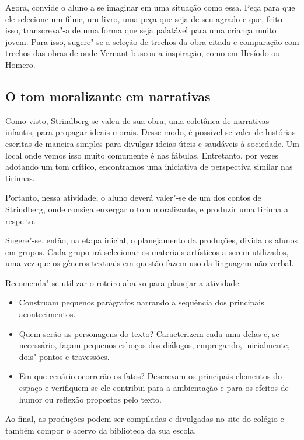 \documentclass[12pt]{extarticle}
\begin{document}
Agora, convide o aluno a se imaginar em uma situação como essa. Peça
para que ele selecione um filme, um livro, uma peça que seja de seu
agrado e que, feito isso, transcreva"-a de uma forma que seja palatável
para uma criança muito jovem. Para isso, sugere"-se a seleção de trechos
da obra citada e comparação com trechos das obras de onde Vernant buscou
a inspiração, como em Hesíodo ou Homero.

    
\subsection{O tom moralizante em narrativas}

Como visto, Strindberg se valeu de sua obra, uma coletânea de
narrativas infantis, para propagar ideais morais. Desse modo, é
possível se valer de histórias escritas de maneira simples para
divulgar ideias úteis e saudáveis à sociedade. Um local onde vemos
isso muito comumente é nas fábulas. Entretanto, por vezes adotando um
tom crítico, encontramos uma iniciativa de perspectiva similar nas
tirinhas.

Portanto, nessa atividade, o aluno deverá valer"-se de um dos contos de
Strindberg, onde consiga enxergar o tom moralizante, e produzir uma
tirinha a respeito.

Sugere"-se, então, na etapa inicial, o planejamento da produções, divida
os alunos em grupos. Cada grupo irá selecionar os materiais artísticos a
serem utilizados, uma vez que os gêneros textuais em questão fazem uso
da linguagem não verbal.

Recomenda"-se utilizar o roteiro abaixo para planejar a atividade:

\begin{itemize}
\item
Construam pequenos parágrafos narrando a sequência dos principais
acontecimentos.
\item
Quem serão as personagens do texto? Caracterizem cada uma delas e, se
necessário, façam pequenos esboços dos diálogos, empregando,
inicialmente, dois"-pontos e travessões.
\item
Em que cenário ocorrerão os fatos? Descrevam os principais elementos
do espaço e verifiquem se ele contribui para a ambientação e para os
efeitos de humor ou reflexão propostos pelo texto.
\end{itemize}

Ao final, as produções podem ser compiladas e divulgadas no site do
colégio e também compor o acervo da biblioteca da sua escola.
\end{document}
